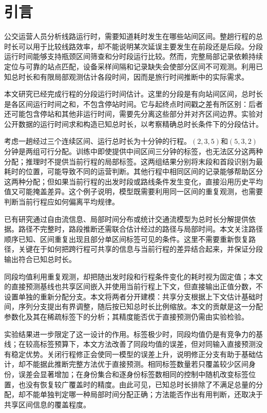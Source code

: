 \section{引言}
公交运营人员分析线路运行时，需要知道耗时发生在哪些站间区间。整趟行程的总时长可以用于比较线路效率，却不能说明某次延误主要发生在前段还是后段。分段运行时间能够支持瓶颈区间筛查和分时段运行比较。然而，完整局部记录依赖持续定位与可靠的站点匹配，设备采样间隔和记录缺失会使部分区间不可观测。利用已知总时长和有限局部观测估计各段时间，因而是旅行时间推断中的实际需求\cite{hellinga2008,hofleitner2011,yin2015entryexit}。

本文研究已经完成行程的分段运行时间估计。这里的分段是有向站间区间，总时长是各区间运行时间之和，不包含停站时间。它与起终点时间戳之差有所区别：后者还可能包含停站和其他非运行时间，需要先分离这些部分并对齐区间边界。实验对公开数据的运行时间求和构造已知总时长，以考察精确总时长条件下的分段估计。

考虑一趟经过三个连续区间、运行总时长为十分钟的行程。$(2,3,5)$和$(5,3,2)$分钟是两组可行分配。训练中即使提供中间区间三分钟的标签，也无法区分这两种分配；推理时不提供当前行程的局部标签。这两组结果分别将末段和首段识别为最耗时的位置，可能导致不同的运营判断。其他行程中相同区间的记录能够帮助区分这两种分配；但如果当前行程的出发时段或路线条件发生变化，直接沿用历史平均值又可能掩盖差异。这个例子说明，模型既需要利用同一区间的重复观测，也需要判断当前行程应如何偏离平均规律。

已有研究通过自由流信息、局部时间分布或统计交通流模型为总时长分解提供依据\cite{hellinga2008,hofleitner2011}。路径不完整时，路段推断还需联合估计经过的路径与局部时间\cite{yin2015entryexit,sun2022prltte}。本文关注路径顺序已知、区间重复出现且部分单区间标签可见的条件。这里不需要重新恢复路径，关键在于如何把跨行程可共享的信息与当前行程的差异结合起来，并保证分段输出符合已知总时长。

同段均值利用重复观测，却把随出发时段和行程条件变化的耗时视为固定值；本文的直接预测基线也共享区间嵌入并使用当前行程上下文，但直接输出正值分数，不设置单独的重新分配分支。本文将两者分开建模：共享分支根据上下文估计基础时间，序列分支提出有界调整，随后按已知总时长比例缩放。本文的贡献是这一分配参数化及其在稀疏标签下的分析；其精度能否优于直接预测仍需由实验检验。

实验结果进一步限定了这一设计的作用。标签极少时，同段均值仍是有竞争力的基线；在较高标签预算下，本文方法改善了同段均值的误差，但对同输入直接预测没有稳定优势。关闭行程修正会使同一模型的误差上升，说明修正分支有助于基础估计，却不能据此推断完整方法优于直接预测。相同标签数量若只覆盖较少区间身份，误差会显著增加；在身份集合和逐身份标签数相同的控制中随机改变标签位置，也没有恢复较广覆盖时的精度。由此可见，已知总时长排除了不满足总量的分配，却不能单独判定哪一种局部时间分配正确；方法能否作出有用判断，还取决于共享区间信息的覆盖程度。
